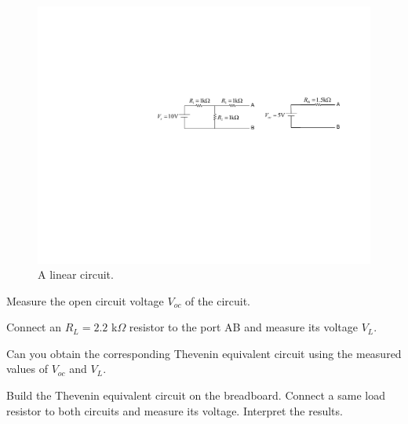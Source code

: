 \documentclass[11pt]{article}
\begin{document}
\begin{question}


    \begin{figure}[H]
        \centering
        \includegraphics[scale=1.2,angle=0]{Fig/cir2.pdf}
        \caption{A linear circuit.} \label{fig:cir2}
    \end{figure}


    \begin{subquestion}{Measure the open circuit voltage $V_{oc}$ of the circuit.}
        \answer{}
    \end{subquestion}

    \begin{subquestion}{Connect an $R_L=2.2$ k$\Omega$ resistor to the port AB and measure its voltage $V_L$.}
        \answer{}
    \end{subquestion}

    \begin{subquestion}{Can you obtain the corresponding Thevenin equivalent circuit using the measured values of $V_{oc}$ and $V_L$.}
        \answer{}
    \end{subquestion}

    \begin{subquestion}{Build the Thevenin equivalent circuit on the breadboard. Connect a same load resistor to both circuits and measure its voltage. Interpret the results.}
        \answer{}
    \end{subquestion}

\end{question}
\end{document}
